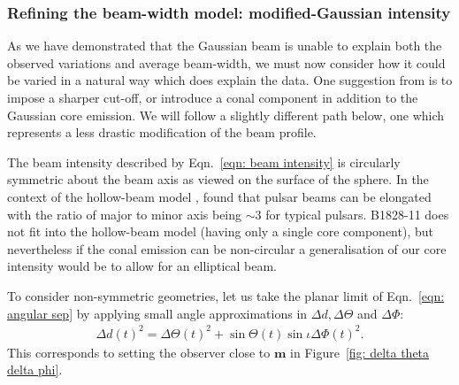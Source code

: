 \documentclass[../full_thesis/full_thesis.tex]{subfiles}
\begin{document}

\subsubsection{Refining the beam-width model: modified-Gaussian intensity}
\label{sec: refining the beam-width model}

As we have demonstrated that the Gaussian beam is unable to explain both the
observed variations and average beam-width, we must now consider how it could be
varied in a natural way which does explain the data. One suggestion from
\citet{Akgun2006} is to impose a sharper cut-off, or introduce a conal
component in addition to the Gaussian core emission.  We will follow a slightly
different path below, one which represents a less drastic modification of the
beam profile.


The beam intensity described by Eqn.~\eqref{eqn: beam intensity} is circularly
symmetric about the beam axis as viewed on the surface of the sphere. In the
context of the hollow-beam model \citep{Radhakrishnan1969}, \citet{Narayan1983}
found that pulsar beams can be elongated with the ratio of major to minor axis
being $\sim3$ for typical pulsars. B1828-11 does not fit into the hollow-beam
model (having only a single core component), but nevertheless if the conal
emission can be non-circular a generalisation of our core intensity would be
to allow for an elliptical beam.

To consider non-symmetric geometries, let us take the planar limit of
Eqn.~\eqref{eqn: angular sep} by
applying small angle approximations in $\Delta d, \Delta\Theta$ and
$\Delta\Phi$:
\begin{align}
\Delta d(t)^{2} = \Delta \Theta(t)^{2} + \sin\Theta(t) \sin\iota \Delta\Phi(t)^{2}.
\label{eqn: angular sep expansion}
\end{align}
This corresponds to setting the observer close to $\mathbf{m}$ in
Figure~\ref{fig: delta theta delta phi}.
\end{document}
